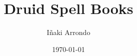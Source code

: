 \documentclass[a5paper,18pt]{book}
\title{Druid Spell Books}
\author{Iñaki Arrondo}
\date{\today}
\begin{document}
\large

\maketitle

\tableofcontents
\end{document}
